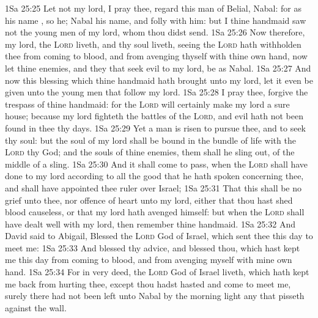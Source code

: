 \vs 1Sa 25:25 Let not my lord, I pray thee, regard this man of Belial,  Nabal: for as his name , so  he; Nabal  his name, and folly  with him: but I thine handmaid saw not the young men of my lord, whom thou didst send.
\vs 1Sa 25:26 Now therefore, my lord,  the \textsc{Lord} liveth, and  thy soul liveth, seeing the \textsc{Lord} hath withholden thee from coming to  blood, and from avenging thyself with thine own hand, now let thine enemies, and they that seek evil to my lord, be as Nabal.
\vs 1Sa 25:27 And now this blessing which thine handmaid hath brought unto my lord, let it even be given unto the young men that follow my lord.
\vs 1Sa 25:28 I pray thee, forgive the trespass of thine handmaid: for the \textsc{Lord} will certainly make my lord a sure house; because my lord fighteth the battles of the \textsc{Lord}, and evil hath not been found in thee  thy days.
\vs 1Sa 25:29 Yet a man is risen to pursue thee, and to seek thy soul: but the soul of my lord shall be bound in the bundle of life with the \textsc{Lord} thy God; and the souls of thine enemies, them shall he sling out,  of the middle of a sling.
\vs 1Sa 25:30 And it shall come to pass, when the \textsc{Lord} shall have done to my lord according to all the good that he hath spoken concerning thee, and shall have appointed thee ruler over Israel;
\vs 1Sa 25:31 That this shall be no grief unto thee, nor offence of heart unto my lord, either that thou hast shed blood causeless, or that my lord hath avenged himself: but when the \textsc{Lord} shall have dealt well with my lord, then remember thine handmaid.
\vs 1Sa 25:32 And David said to Abigail, Blessed  the \textsc{Lord} God of Israel, which sent thee this day to meet me:
\vs 1Sa 25:33 And blessed  thy advice, and blessed  thou, which hast kept me this day from coming to  blood, and from avenging myself with mine own hand.
\vs 1Sa 25:34 For in very deed,  the \textsc{Lord} God of Israel liveth, which hath kept me back from hurting thee, except thou hadst hasted and come to meet me, surely there had not been left unto Nabal by the morning light any that pisseth against the wall.
